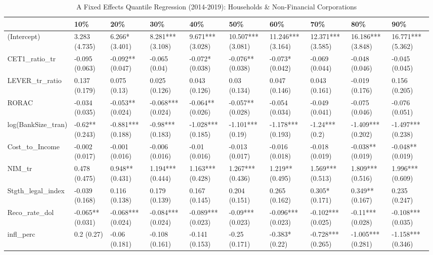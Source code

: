 \begin{table}[ht]
\centering
\caption{A Fixed Effects Quantile Regression (2014-2019): Households & Non-Financial Corporations} 
\begingroup\small
\begin{tabular}{llllllllll}
  \toprule
 & 10\% & 20\% & 30\% & 40\% & 50\% & 60\% & 70\% & 80\% & 90\% \\ 
  \midrule
(Intercept) & 3.283 (4.735) & 6.266* (3.401) & 8.281*** (3.108) & 9.671*** (3.028) & 10.507*** (3.081) & 11.246*** (3.164) & 12.371*** (3.585) & 16.186*** (3.848) & 16.771*** (5.362) \\ 
  CET1\_ratio\_tr & -0.095 (0.063) & -0.092** (0.047) & -0.065 (0.04) & -0.072* (0.038) & -0.076** (0.038) & -0.073* (0.042) & -0.069 (0.044) & -0.048 (0.046) & -0.045 (0.045) \\ 
  LEVER\_tr\_ratio & 0.137 (0.179) & 0.075 (0.13) & 0.025 (0.126) & 0.043 (0.126) & 0.03 (0.134) & 0.047 (0.146) & 0.043 (0.161) & -0.019 (0.176) & 0.156 (0.205) \\ 
  RORAC & -0.034 (0.035) & -0.053** (0.024) & -0.068*** (0.024) & -0.064** (0.026) & -0.057** (0.028) & -0.054 (0.034) & -0.049 (0.041) & -0.075 (0.046) & -0.076 (0.051) \\ 
  log(BankSize\_tran) & -0.62** (0.243) & -0.881*** (0.188) & -0.98*** (0.183) & -1.028*** (0.185) & -1.101*** (0.19) & -1.178*** (0.193) & -1.24*** (0.2) & -1.409*** (0.202) & -1.497*** (0.238) \\ 
  Cost\_to\_Income & -0.002 (0.017) & -0.001 (0.016) & -0.006 (0.016) & -0.01 (0.016) & -0.013 (0.017) & -0.016 (0.018) & -0.018 (0.019) & -0.038** (0.019) & -0.048** (0.019) \\ 
  NIM\_tr & 0.478 (0.475) & 0.948** (0.431) & 1.194*** (0.444) & 1.163*** (0.428) & 1.267*** (0.436) & 1.219** (0.495) & 1.569*** (0.513) & 1.809*** (0.516) & 1.996*** (0.609) \\ 
  Stgth\_legal\_index & -0.039 (0.168) & 0.116 (0.138) & 0.179 (0.139) & 0.167 (0.145) & 0.204 (0.151) & 0.265 (0.162) & 0.305* (0.171) & 0.349** (0.167) & 0.235 (0.247) \\ 
  Reco\_rate\_dol & -0.065** (0.031) & -0.068*** (0.024) & -0.084*** (0.024) & -0.089*** (0.023) & -0.09*** (0.023) & -0.096*** (0.023) & -0.102*** (0.025) & -0.11*** (0.028) & -0.108*** (0.035) \\ 
  infl\_perc & 0.2 (0.27) & -0.06 (0.181) & -0.108 (0.161) & -0.141 (0.153) & -0.25 (0.171) & -0.383* (0.22) & -0.728*** (0.265) & -1.005*** (0.281) & -1.158*** (0.346) \\ 

\end{tabular}
\end{table}
